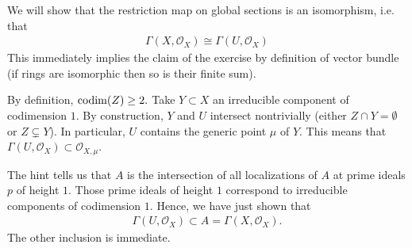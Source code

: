 \begin{exercise}{4}
    We will show that the restriction map on global sections is an isomorphism, i.e. that
    \begin{align*}
        \Gamma(X,\mathcal{O}_X)\cong \Gamma(U,\mathcal{O}_X)
    \end{align*}
    This immediately implies the claim of the exercise by definition of vector bundle (if rings are isomorphic
    then so is their finite sum).

    By definition, $\operatorname{codim}(Z)\geq 2.$
    Take $Y\subset X$ an irreducible component of codimension $1$. By construction, $Y$ and $U$ intersect nontrivially
     (either $Z\cap Y=\emptyset$ or $Z\subsetneq Y$). 
     In particular, $U$ contains the generic point $\mu$ of $Y$. 
     This means that $\Gamma(U,\mathcal{O}_X)\subset \mathcal{O}_{X,\mu}$.

     The hint tells us that $A$ is the intersection of all localizations of $A$ at prime ideals $p$ of height $1$.
     Those prime ideals of height $1$ correspond to irreducible components of codimension $1$. Hence, we have just shown that
     \begin{align*}
        \Gamma(U,\mathcal{O}_X)\subset A = \Gamma(X,\mathcal{O}_X).
     \end{align*}
     The other inclusion is immediate.
\end{exercise}


